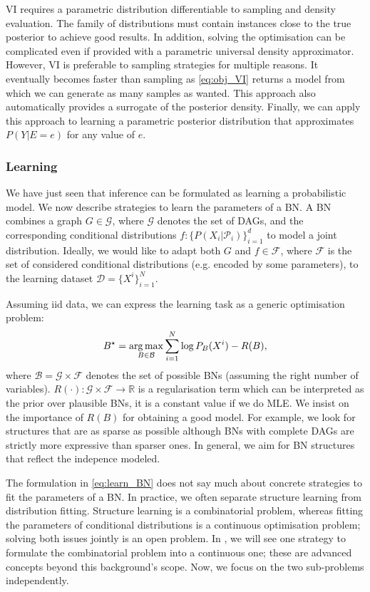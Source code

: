 VI requires a parametric distribution differentiable to sampling and density evaluation. The family of distributions must contain instances close to the true posterior to achieve good results. In addition, solving the optimisation can be complicated even if provided with a parametric universal density approximator. However, VI is preferable to sampling strategies for multiple reasons. It eventually becomes faster than sampling as \ref{eq:obj_VI} returns a model from which we can generate as many samples as wanted. This approach also automatically provides a surrogate of the posterior density. Finally, we can apply this approach to learning a parametric posterior distribution that approximates $P(Y|E=e)$ for any value of $e$.
\subsubsection{Learning}
We have just seen that inference can be formulated as learning a probabilistic model. We now describe strategies to learn the parameters of a BN.
A BN combines a graph $G \in \mathcal{G}$, where $\mathcal{G}$ denotes the set of DAGs, and the corresponding conditional distributions $f: \{P(X_i|\mathcal{P}_i)\}_{i=1}^d$ to model a joint distribution. Ideally, we would like to adapt both $G$ and $f \in \mathcal{F}$, where $\mathcal{F}$ is the set of considered conditional distributions (e.g. encoded by some parameters), to the learning dataset $\mathcal{D}=\{X^i\}_{i=1}^N$.

Assuming iid data, we can express the learning task as a generic optimisation problem:
\begin{align}
  B^\star  = \operatorname*{arg\,max}_{B\in\mathcal{B}} \sum_{i=1}^N \log P_B(X^i) - R(B), \label{eq:learn_BN}
\end{align}
where $\mathcal{B} = \mathcal{G} \times \mathcal{F}$ denotes the set of possible BNs (assuming the right number of variables). $R(\cdot): \mathcal{G} \times \mathcal{F} \rightarrow \mathbb{R}$ is a regularisation term which can be interpreted as the prior over plausible BNs, it is a constant value if we do MLE. We insist on the importance of $R(B)$ for obtaining a good model. For example, we look for structures that are as sparse as possible although BNs with complete DAGs are strictly more expressive than sparser ones. In general, we aim for BN structures that reflect the indepence modeled.

The formulation in \ref{eq:learn_BN} does not say much about concrete strategies to fit the parameters of a BN. In practice, we often separate structure learning from distribution fitting. Structure learning is a combinatorial problem, whereas fitting the parameters of conditional distributions is a continuous optimisation problem; solving both issues jointly is an open problem. In , we will see one strategy to formulate the combinatorial problem into a continuous one; these are advanced concepts beyond this background’s scope. Now, we focus on the two sub-problems independently.

